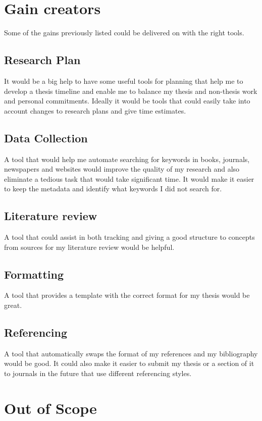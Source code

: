 \documentclass{article}
\begin{document}
\section*{Gain creators}
Some of the gains previously listed could be delivered on with the right tools.
\subsection*{Research Plan}
It would be a big help to have some useful tools for planning that help me to develop a thesis timeline and enable me to balance my thesis and non-thesis work and personal commitments. Ideally it would be tools that could easily take into account changes to research plans and give time estimates. \par

\subsection*{Data Collection}

A tool that would help me automate searching for keywords in books, journals, newspapers and websites would improve the quality of my research and also eliminate a tedious task that would take significant time. It would make it easier to keep the metadata and identify what keywords I did not search for.

\subsection*{Literature review}
A tool that could assist in both tracking and giving a good structure to concepts from sources for my literature review would be helpful.

\subsection*{Formatting}
A tool that provides a template with the correct format for my thesis would be great.

\subsection*{Referencing}

A tool that automatically swaps the format of my references and my bibliography would be good. It could also make it easier to submit my thesis or a section of it to journals in the future that use different referencing styles.

\section*{Out of Scope}
\end{document}
